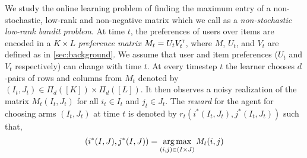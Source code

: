 We study the online learning problem of finding the maximum entry of a non-stochastic, low-rank and non-negative matrix which we call as a \emph{non-stochastic low-rank bandit problem}. At time $t$, the preferences of users over items are encoded in a $K \times L$ \emph{preference matrix} $M_t = U_t V_t^\mathsf{\scriptscriptstyle T}$, where $M$, $U_t$, and $V_t$ are defined as in \cref{sec:background}. We assume that user and item preferences ($U_t$ and $V_t$ respectively) can change with time $t$. At every timestep $t$ the learner chooses $d$-pairs of rows and columns from $M_t$ denoted by $(I_t,J_t)\in \Pi_d([K])\times \Pi_d([L])$. It then observes a noisy realization of the matrix $M_{t}(I_t,J_t)$ for all $i_t\in I_t$ and $j_t \in J_t$. The \emph{reward} for the agent for choosing arms $(I_t,J_t)$ at time $t$ is denoted by $r_t(i^\ast(I_t,J_t),j^\ast(I_t,J_t))$ such that,
\begin{align}
  (i^\ast(I,J),j^\ast(I,J)) = \mathop{\rm arg\,max}_{(i,j) \in (I\times J)} M_{t}(i,j)
  \label{eq:reward}
\end{align}




